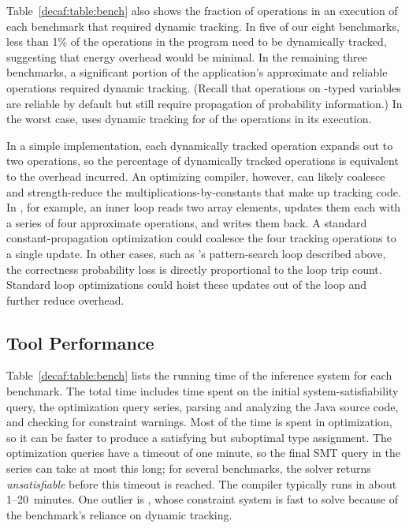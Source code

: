 {Table~\ref{decaf:table:bench} also shows the fraction of operations in an execution
of each benchmark that required dynamic tracking.
In five of our eight benchmarks, less than 1\% of the operations in the
program need to be dynamically tracked, suggesting that energy overhead would
be minimal.
In the remaining three benchmarks, a significant portion of the application's
approximate and reliable operations required dynamic tracking.
(Recall that operations on -typed variables are reliable by default
but still require propagation of probability information.)
In the worst case,  uses dynamic tracking for  of
the operations in its execution.

In a simple implementation, each dynamically tracked operation expands out to
two operations, so
the percentage of dynamically tracked operations is equivalent to the
overhead incurred.
An optimizing compiler, however, can likely coalesce and strength-reduce the
multiplications-by-constants that make up tracking code.
In , for example, an inner loop reads two array elements, updates
them each with a series of four approximate operations, and writes them back.
A standard constant-propagation optimization could coalesce the four tracking
operations to a single update.
In other cases, such as 's pattern-search loop described above,
the correctness probability loss is directly proportional to the loop trip
count.
Standard loop optimizations could hoist these updates out of the loop and
further reduce overhead.


\subsection{Tool Performance}

Table~\ref{decaf:table:bench} lists the running time of the inference system for
each benchmark.
The total time includes time spent on the initial system-satisfiability query,
the optimization query series, parsing and analyzing the Java
source code, and checking for \lang constraint warnings.
Most of the time is spent in optimization, so it can be faster to produce a
satisfying but suboptimal type assignment.
The optimization queries have a timeout of one minute, so the final SMT query
in the series can take at most this long; for several benchmarks, the solver
returns \emph{unsatisfiable} before this timeout is reached.
The compiler typically runs in about 1--20~minutes.
One outlier is , whose constraint system is fast to solve because of
the benchmark's reliance on dynamic tracking.

}
